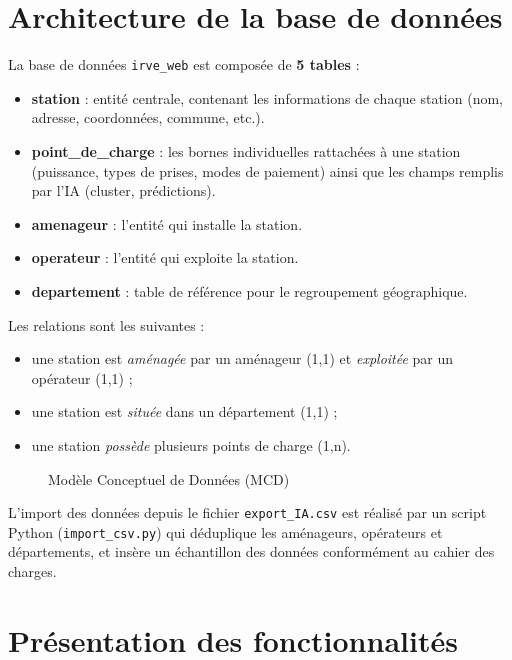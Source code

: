 \documentclass[a4paper,11pt]{article}
\begin{document}
\section{Architecture de la base de données}

La base de données \texttt{irve\_web} est composée de \textbf{5 tables} :

\begin{itemize}[noitemsep]
  \item \textbf{station} : entité centrale, contenant les informations de chaque station
        (nom, adresse, coordonnées, commune, etc.).
  \item \textbf{point\_de\_charge} : les bornes individuelles rattachées à une station
        (puissance, types de prises, modes de paiement) ainsi que les champs remplis par
        l'IA (cluster, prédictions).
  \item \textbf{amenageur} : l'entité qui installe la station.
  \item \textbf{operateur} : l'entité qui exploite la station.
  \item \textbf{departement} : table de référence pour le regroupement géographique.
\end{itemize}

Les relations sont les suivantes :
\begin{itemize}[noitemsep]
  \item une station est \emph{aménagée} par un aménageur (1,1) et \emph{exploitée} par un
        opérateur (1,1) ;
  \item une station est \emph{située} dans un département (1,1) ;
  \item une station \emph{possède} plusieurs points de charge (1,n).
\end{itemize}

\begin{figure}[h]
  \centering
  \caption{Modèle Conceptuel de Données (MCD)}
\end{figure}

L'import des données depuis le fichier \texttt{export\_IA.csv} est réalisé par un script
Python (\texttt{import\_csv.py}) qui déduplique les aménageurs, opérateurs et départements,
et insère un échantillon des données conformément au cahier des charges.

\section{Présentation des fonctionnalités}
\end{document}
